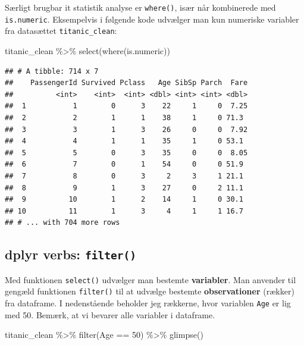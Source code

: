\documentclass[
]{book}
\newenvironment{Shaded}{\begin{snugshade}}{\end{snugshade}}
\newcommand{\DecValTok}[1]{\textcolor[rgb]{0.00,0.00,0.81}{#1}}
\newcommand{\FunctionTok}[1]{\textcolor[rgb]{0.00,0.00,0.00}{#1}}
\newcommand{\NormalTok}[1]{#1}
\newcommand{\SpecialCharTok}[1]{\textcolor[rgb]{0.00,0.00,0.00}{#1}}
\begin{document}
Særligt brugbar it statistik analyse er \texttt{where()}, især når kombinerede med \texttt{is.numeric}. Eksempelvis i følgende kode udvælger man kun numeriske variabler fra datasættet \texttt{titanic\_clean}:

\begin{Shaded}
\begin{Highlighting}[]
\NormalTok{titanic\_clean }\SpecialCharTok{\%\textgreater{}\%} \FunctionTok{select}\NormalTok{(}\FunctionTok{where}\NormalTok{(is.numeric))}
\end{Highlighting}
\end{Shaded}

\begin{verbatim}
## # A tibble: 714 x 7
##    PassengerId Survived Pclass   Age SibSp Parch  Fare
##          <int>    <int>  <int> <dbl> <int> <int> <dbl>
##  1           1        0      3    22     1     0  7.25
##  2           2        1      1    38     1     0 71.3 
##  3           3        1      3    26     0     0  7.92
##  4           4        1      1    35     1     0 53.1 
##  5           5        0      3    35     0     0  8.05
##  6           7        0      1    54     0     0 51.9 
##  7           8        0      3     2     3     1 21.1 
##  8           9        1      3    27     0     2 11.1 
##  9          10        1      2    14     1     0 30.1 
## 10          11        1      3     4     1     1 16.7 
## # ... with 704 more rows
\end{verbatim}

\hypertarget{dplyr-verbs-filter}{%
\subsection{\texorpdfstring{dplyr verbs: \texttt{filter()}}{dplyr verbs: filter()}}\label{dplyr-verbs-filter}}

Med funktionen \texttt{select()} udvælger man bestemte \textbf{variabler}. Man anvender til gengæld funktionen \texttt{filter()} til at udvælge bestemte \textbf{observationer} (rækker) fra dataframe. I nedenstående beholder jeg rækkerne, hvor variablen \texttt{Age} er lig med 50. Bemærk, at vi bevarer alle variabler i dataframe.

\begin{Shaded}
\begin{Highlighting}[]
\NormalTok{titanic\_clean }\SpecialCharTok{\%\textgreater{}\%} 
  \FunctionTok{filter}\NormalTok{(Age }\SpecialCharTok{==} \DecValTok{50}\NormalTok{) }\SpecialCharTok{\%\textgreater{}\%}
  \FunctionTok{glimpse}\NormalTok{()}
\end{Highlighting}
\end{Shaded}
\end{document}
